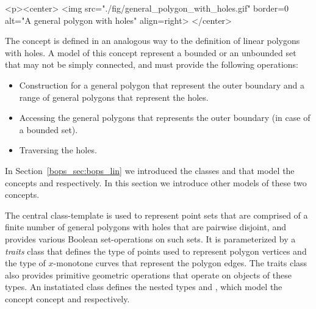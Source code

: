 \lcTex{%
  \setlength{\widthRight}{1.4cm}
  \setlength{\widthLeft}{\widthLineReal}
  \addtolength{\widthLeft}{-\widthRight}
  \begin{minipage}{\widthLeft}
}
\label{fig:general_polygon_with_holes}
\begin{ccHtmlOnly}
  <p><center>
    <img src="./fig/general_polygon_with_holes.gif" border=0 alt="A general polygon with holes" align=right>
  </center>
\end{ccHtmlOnly}
The concept  is defined in an analogous
way to the definition of linear polygons with holes. A model of this
concept represent a bounded or an unbounded set that may not be simply
connected, and must provide the following operations:
\begin{itemize}
\item Construction for a general polygon that represent the outer boundary
and a range of general polygons that represent the holes.
\item Accessing the general polygons that represents the outer boundary
(in case of a bounded set).
\item Traversing the holes.
\end{itemize}
In Section~\ref{bops_sec:bops_lin} we introduced the classes
 and  that model the concepts
 and 
respectively. In this section we introduce other models of these two
concepts.

The central class-template  is used to
represent point sets that are comprised of a finite number of general
polygons with holes that are pairwise disjoint, and provides various Boolean
set-operations on such sets. It is parameterized by a {\em traits}
class that defines the type of points used to represent polygon
vertices and the type of $x$-monotone curves that represent the
polygon edges. The traits class also provides primitive geometric
operations that operate on objects of these types. An instatiated
 class defines the nested types 
 and
, which model
the concept  concept and
 respectively.


